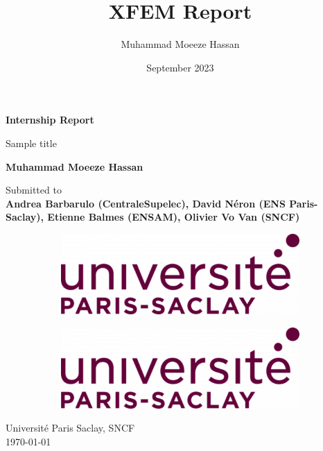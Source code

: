 \documentclass[12pt,a4paper]{report}
\title{XFEM Report}
\author{Muhammad Moeeze Hassan}
\date{September 2023}
\begin{document}
\dominitoc

\begin{titlepage}
    \begin{center}
        \vspace*{1cm}
             
        \Huge
        \textbf{Internship Report}
            
        \vspace{0.5cm}
        \LARGE
        Sample title

            
        \vspace{1cm}
            
        \textbf{Muhammad Moeeze Hassan}
            
        \vfill
            
        Submitted to\\
        \textbf{Andrea Barbarulo (CentraleSupelec), David Néron (ENS Paris-Saclay), Etienne Balmes (ENSAM), Olivier Vo Van (SNCF)}
            
        \vspace{0.4cm}
            
        \begin{figure}[htb]
            \centering
            \begin{subfigure}[htb]{0.20\textwidth}
                \centering
                \includegraphics[width=\textwidth]{logo.png}
            \end{subfigure}
            \begin{subfigure}[htb]{0.10\textwidth}
                \centering
                \includegraphics[width=\textwidth]{logo.png}
            \end{subfigure}
        \end{figure}            
        \Large
        Université Paris Saclay, SNCF\\
        \today \par \vspace{-0.1cm}            
    \end{center}
\end{titlepage}
\end{document}
